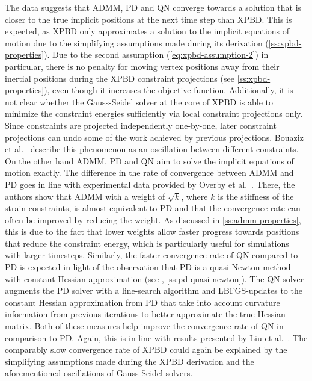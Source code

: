 The data suggests that ADMM, PD and QN converge towards a solution that is closer to the true implicit positions at the next time step than XPBD. This is expected, 
as XPBD only approximates a solution to the implicit equations of motion due to the simplifying assumptions made during its derivation (\cref{ss:xpbd-properties}).
Due to the second assumption (\cref{eq:xpbd-assumption-2}) in particular, there is no penalty for moving vertex positions away from their inertial positions during 
the XPBD constraint projections (see \cref{ss:xpbd-properties}), even though it increases the objective function. Additionally,
it is not clear whether the Gauss-Seidel solver at the core of XPBD is able to minimize the constraint energies sufficiently via local constraint projections only.
Since constraints are projected independently one-by-one, later constraint projections can undo some of the work achieved by previous projections. Bouaziz et al.\ 
\cite{bouaziz2014} describe this phenomenon as an oscillation between different constraints. On the other hand ADMM, PD and QN aim to solve the implicit equations 
of motion exactly. The difference in the rate of convergence between ADMM and PD goes in line 
with experimental data provided by Overby et al.\ \cite{overby2017}. There, the authors show that ADMM with a weight of $\sqrt{k}$, where $k$ is the stiffness of the 
strain constraints, is almost equivalent to PD and that the convergence rate can often be improved by reducing the weight. As discussed in 
\autoref{ss:admm-properties}, this is due to the fact that lower weights allow faster progress towards positions that reduce the constraint energy, which is particularly 
useful for simulations with larger timesteps. Similarly, the faster convergence rate of QN compared to PD is expected in light of the observation that PD is a quasi-Newton method 
with constant Hessian approximation (see \cite{liu2017}, \cref{ss:pd-quasi-newton}). The QN solver augments the PD solver with a line-search algorithm and LBFGS-updates to 
the constant Hessian approximation from PD that take into account curvature information from previous iterations to better approximate the true Hessian matrix. Both
of these measures help improve the convergence rate of QN in comparison to PD. Again, this is in line with results presented by Liu et al.\ \cite{liu2017}. The comparably
slow convergence rate of XPBD could again be explained by the simplifying assumptions made during the XPBD derivation and the aforementioned oscillations of Gauss-Seidel
solvers. 

